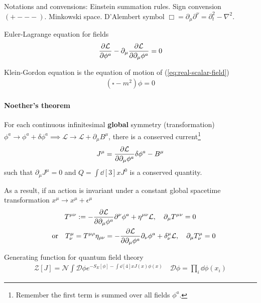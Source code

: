 \documentclass{article}
\newcommand{\p}{\partial}
\newcommand{\La}{\mathcal{L}}
\newcommand{\ra}{\rightarrow}
\begin{document}
\begin{multicols}{2}
Notations and convensions:
Einstein summation rules. Sign convension $(+---)$. Minkowski space. D'Alembert symbol $\Box = \partial_\mu\partial^\nu = \partial_t^2 - \nabla^2$.

Euler-Lagrange equation for fields
\begin{gather}
    \pdv{\La}{\phi^a} - \p_\mu\pdv{\La}{\p_\mu \phi^a} = 0
\end{gather}

Klein-Gordon equation is the equation of motion of (\ref{eq:real-scalar-field})
\begin{gather}
    (\square - m^2)\phi = 0
\end{gather}

\paragraph{Noether's theorem} For each continuous infinitesimal \textbf{global} symmetry (transformation) $\phi^a \rightarrow \phi^a + \delta \phi^a \implies \La \rightarrow \La + \partial_{\mu}B^\mu$, there is a conserved current\footnote{Remember the first term is summed over all fields $\phi^a$.}
\begin{gather}
    J^\mu = \pdv{\La}{\partial_\mu\phi^a}\delta\phi^a - B^\mu
\end{gather}
such that $\partial_\mu J^\mu = 0$ and $Q = \int \dd[3]{x} J^0$ is a conserved quantity.

As a result, if an action is invariant under a constant global spacetime transformation $x^\mu \ra x^\mu + \epsilon^\mu$
\begin{gather}
    T^{\mu\nu} := - \pdv{\La}{\partial_\mu\phi^a} \partial^\nu \phi^a + \eta^{\mu\nu}\mathcal{L} ,\quad \partial_{\mu } T^{\mu\nu} = 0\\
    \qq{or} T^\mu_\nu = T^{\mu\rho}\eta_{\rho\nu} = - \pdv{\La}{\partial_\mu\phi^a} \partial_\nu \phi^a + \delta^\mu_\nu\mathcal{L} ,\quad \partial_\mu T^\mu_\nu = 0
\end{gather}

Generating function for quantum field theory
\begin{gather}
\mathcal{Z}[J] = \mathcal{N} \int\mathcal{D}\phi e^{-S_E[\phi] - \int\dd[4]{x}J(x)\phi(x)} \quad \mathcal{D} \phi = \prod_i \dd{\phi(x_{i})}
\end{gather}

\end{multicols}
\end{document}
